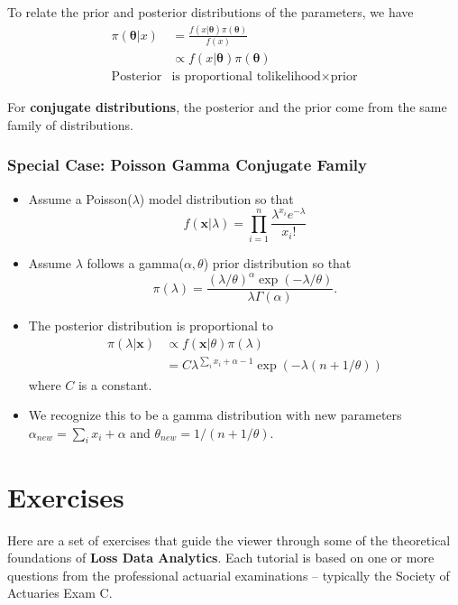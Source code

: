 \documentclass[]{book}
\begin{document}
To relate the prior and posterior distributions of the parameters, we
have \[\begin{aligned}
\pi(\boldsymbol \theta | x)&=\frac{f(x|\boldsymbol \theta )\pi(\boldsymbol \theta)}{f(x)} \\
& \propto  f(x|\boldsymbol \theta ) \pi(\boldsymbol \theta) \\
\text{Posterior} &\text{is proportional to} \text{likelihood} \times \text{prior}
\end{aligned}\]

For \textbf{conjugate distributions}, the posterior and the prior come
from the same family of distributions.

\subsubsection{Special Case: Poisson Gamma Conjugate
Family}\label{special-case-poisson-gamma-conjugate-family}

\begin{itemize}
\item
  Assume a Poisson(\(\lambda\)) model distribution so that
  \[f(\mathbf{x} | \lambda) = \prod_{i=1}^n \frac{\lambda^{x_i} e^{-\lambda}}{x_i!}\]
\item
  Assume \(\lambda\) follows a gamma(\(\alpha, \theta\)) prior
  distribution so that
  \[\pi(\lambda) = \frac{\left(\lambda/\theta\right)^{\alpha} \exp(-\lambda/\theta)}{\lambda \Gamma(\alpha)}.\]
\item
  The posterior distribution is proportional to \[\begin{aligned}
  \pi(\lambda | \mathbf{x}) & \propto f(\mathbf{x}|\theta ) \pi(\lambda) \\
  &= C \lambda^{\sum_i x_i + \alpha -1} \exp(-\lambda (n+1/\theta))\end{aligned}\]
  where \(C\) is a constant.
\item
  We recognize this to be a gamma distribution with new parameters
  \(\alpha_{new} = \sum_i x_i + \alpha\) and
  \(\theta_{new} = 1/(n + 1/\theta)\).
\end{itemize}

\section{Exercises}\label{exercises-2}

Here are a set of exercises that guide the viewer through some of the
theoretical foundations of \textbf{Loss Data Analytics}. Each tutorial
is based on one or more questions from the professional actuarial
examinations -- typically the Society of Actuaries Exam C.
\end{document}
